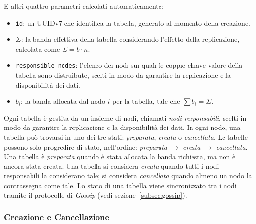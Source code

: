 E altri quattro parametri calcolati automaticamente:
\begin{itemize}
    \item \texttt{id}: un UUIDv7 che identifica la tabella, generato al momento della creazione.
    \item $\Sigma$: la banda effettiva della tabella considerando l'effetto della replicazione, calcolata come $\displaystyle \Sigma = b \cdot n$.
    \item \texttt{responsible\_nodes}: l'elenco dei nodi sui quali le coppie chiave-valore della tabella sono distruibute, scelti in modo da garantire la replicazione e la disponibilità dei dati.
    \item $b_i$: la banda allocata dal nodo $i$ per la tabella, tale che $\displaystyle \sum b_i = \Sigma$.
\end{itemize}

Ogni tabella è gestita da un insieme di nodi, chiamati \emph{nodi responsabili}, scelti in modo da garantire la replicazione e la disponibilità dei dati.
In ogni nodo, una tabella può trovarsi in uno dei tre stati: \emph{preparata}, \emph{creata} o \emph{cancellata}.
Le tabelle possono solo progredire di stato, nell'ordine: \emph{preparata} $\rightarrow$ \emph{creata} $\rightarrow$ \emph{cancellata}.
Una tabella è \emph{preparata} quando è stata allocata la banda richiesta, ma non è ancora stata creata.
Una tabella si considera \emph{creata} quando tutti i nodi responsabili la considerano tale; si considera \emph{cancellata} quando almeno un nodo la contrassegna come tale.
Lo stato di una tabella viene sincronizzato tra i nodi tramite il protocollo di \emph{Gossip} (vedi sezione~\ref{subsec:gossip}).

\subsubsection{Creazione e Cancellazione}
\label{subsubsec:creazione-cancellazione}

